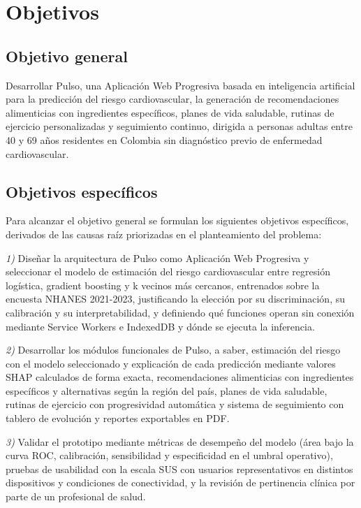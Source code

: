 \documentclass[conference]{IEEEtran}
\begin{document}
\section{Objetivos}
\subsection{Objetivo general}
Desarrollar Pulso, una Aplicación Web Progresiva basada en inteligencia artificial para la predicción del riesgo cardiovascular, la generación de recomendaciones alimenticias con ingredientes específicos, planes de vida saludable, rutinas de ejercicio personalizadas y seguimiento continuo, dirigida a personas adultas entre 40 y 69 años residentes en Colombia sin diagnóstico previo de enfermedad cardiovascular.

\subsection{Objetivos específicos}
Para alcanzar el objetivo general se formulan los siguientes objetivos específicos, derivados de las causas raíz priorizadas en el planteamiento del problema:

\textit{1)} Diseñar la arquitectura de Pulso como Aplicación Web Progresiva y seleccionar el modelo de estimación del riesgo cardiovascular entre regresión logística, gradient boosting y k vecinos más cercanos, entrenados sobre la encuesta NHANES 2021-2023, justificando la elección por su discriminación, su calibración y su interpretabilidad, y definiendo qué funciones operan sin conexión mediante Service Workers e IndexedDB y dónde se ejecuta la inferencia.

\textit{2)} Desarrollar los módulos funcionales de Pulso, a saber, estimación del riesgo con el modelo seleccionado y explicación de cada predicción mediante valores SHAP calculados de forma exacta, recomendaciones alimenticias con ingredientes específicos y alternativas según la región del país, planes de vida saludable, rutinas de ejercicio con progresividad automática y sistema de seguimiento con tablero de evolución y reportes exportables en PDF.

\textit{3)} Validar el prototipo mediante métricas de desempeño del modelo (área bajo la curva ROC, calibración, sensibilidad y especificidad en el umbral operativo), pruebas de usabilidad con la escala SUS con usuarios representativos en distintos dispositivos y condiciones de conectividad, y la revisión de pertinencia clínica por parte de un profesional de salud.
\end{document}
